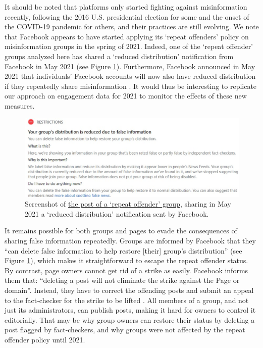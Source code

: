 \documentclass[review]{elsarticle}
\begin{document}
{{It should be noted that platforms only started fighting against misinformation recently, following the 2016 U.S. presidential election for some and the onset of the COVID-19 pandemic for others, and their practices are still evolving.
We note that Facebook appears to have started applying its `repeat offenders’ policy on misinformation groups in the spring of 2021. 
Indeed, one of the `repeat offender' groups analyzed here has shared a `reduced distribution' notification from Facebook in May 2021 (see Figure \ref{screenshot_reduced_group}).
Furthermore, Facebook announced in May 2021 that individuals’ Facebook accounts will now also have reduced distribution if they repeatedly share misinformation \cite{FacebookReduceUsers}.
It would thus be interesting to replicate our approach on engagement data for 2021 to monitor the effects of these new measures.

\begin{figure}[!h]
\centering
\includegraphics[scale=0.24]{./../figure/screenshot_reduced_group.png}
\caption{
Screenshot of \href{https://www.facebook.com/groups/mcbowwow/posts/3893068180741848/}{the post of a `repeat offender' group}, sharing in May 2021 a `reduced distribution' notification sent by Facebook.
}
\label{screenshot_reduced_group}
\end{figure}

It remains possible for both groups and pages to evade the consequences of sharing false information repeatedly. 
Groups are informed by Facebook that they ``can delete false information to help restore [their] group's distribution'' (see Figure \ref{screenshot_reduced_group}), which makes it straightforward to escape the repeat offender status.
By contrast, page owners cannot get rid of a strike as easily. 
Facebook informs them that: ``deleting a post will not eliminate the strike against the Page or domain''. 
Instead, they have to correct the offending posts and submit an appeal to the fact-checker for the strike to be lifted \cite{FacebookCorrectRating}.
All members of a group, and not just its administrators, can publish posts,  making it hard for owners to control it editorially. 
That may be why group owners can restore their status by deleting a post flagged by fact-checkers, and why groups were not affected by the repeat offender policy until 2021.

}}
\end{document}

